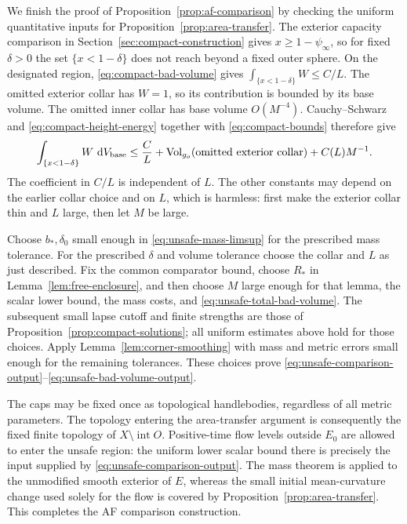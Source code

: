 We finish the proof of Proposition~\ref{prop:af-comparison} by
checking the uniform quantitative inputs for
Proposition~\ref{prop:area-transfer}.  The exterior capacity
comparison in Section~\ref{sec:compact-construction} gives
\(x\ge1-\psi_\infty\), so for fixed \(\delta>0\) the set
\(\{x<1-\delta\}\) does not reach beyond a fixed outer sphere.
On the designated region, \eqref{eq:compact-bad-volume} gives
\(\int_{\{x<1-\delta\}}W\le C/L\).  The omitted exterior
collar has \(W=1\), so its contribution is bounded by its base
volume.  The omitted inner collar has base volume \(O(M^{-4})\).
Cauchy--Schwarz and \eqref{eq:compact-height-energy} together
with \eqref{eq:compact-bounds} therefore give
\begin{equation}
 \int_{\{x<1-\delta\}}W\,\mathop{}\!\mathrm d V_{\rm base}
 \le \frac CL+\operatorname{Vol}_{g_o}(\text{omitted exterior collar})
       +C(L)M^{-1}.
 \label{eq:unsafe-total-bad-volume}
\end{equation}
The coefficient in \(C/L\) is independent of \(L\).  The
other constants may depend on the earlier collar choice and
on \(L\), which is harmless: first make the exterior collar
thin and \(L\) large, then let \(M\) be large.

Choose \(b_*,\delta_0\) small enough in
\eqref{eq:unsafe-mass-limsup} for the prescribed mass tolerance.
For the prescribed \(\delta\) and volume tolerance choose the
collar and \(L\) as just described.  Fix the common comparator
bound, choose \(R_*\) in Lemma~\ref{lem:free-enclosure}, and
then choose \(M\) large enough for that lemma, the scalar
lower bound, the mass costs, and
\eqref{eq:unsafe-total-bad-volume}.  The subsequent small lapse
cutoff and finite strengths are those of
Proposition~\ref{prop:compact-solutions}; all uniform estimates
above hold for those choices.  Apply
Lemma~\ref{lem:corner-smoothing} with mass and metric errors
small enough for the remaining tolerances.  These choices prove
\eqref{eq:unsafe-comparison-output}--\eqref{eq:unsafe-bad-volume-output}.

The caps may be fixed once as topological handlebodies, regardless
of all metric parameters.  The topology entering the area-transfer
argument is consequently the fixed finite topology of
\(X\setminus\operatorname{int}O\).  Positive-time flow levels
outside \(E_0\) are allowed to enter the unsafe region: the
uniform lower scalar bound there is precisely the input supplied
by \eqref{eq:unsafe-comparison-output}.  The mass theorem is
applied to the unmodified smooth exterior of \(E\), whereas
the small initial mean-curvature change used solely for the flow
is covered by Proposition~\ref{prop:area-transfer}.  This
completes the AF comparison construction.
